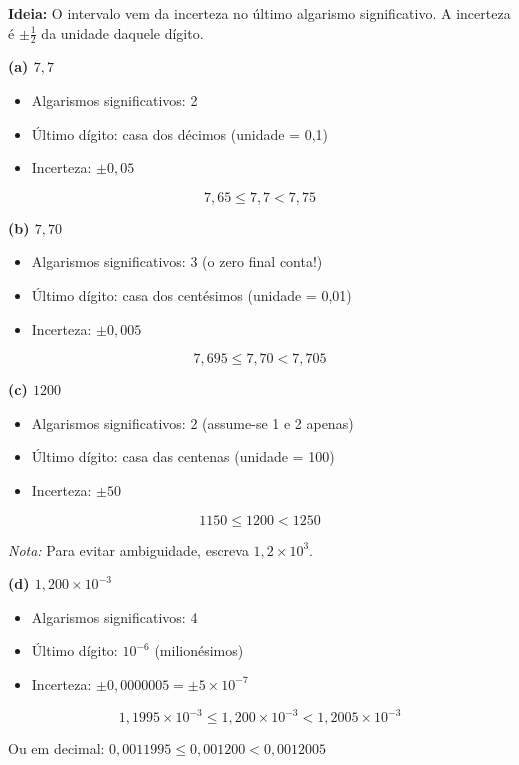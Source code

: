 
\textbf{Ideia:} O intervalo vem da incerteza no último algarismo significativo. A incerteza é $\pm\frac{1}{2}$ da unidade daquele dígito.

\textbf{(a) $7{,}7$}

\begin{itemize}
\item Algarismos significativos: 2
\item Último dígito: casa dos décimos (unidade = 0,1)
\item Incerteza: $\pm 0{,}05$
\end{itemize}

\[
\boxed{7{,}65 \leq 7{,}7 < 7{,}75}
\]

\textbf{(b) $7{,}70$}

\begin{itemize}
\item Algarismos significativos: 3 (o zero final conta!)
\item Último dígito: casa dos centésimos (unidade = 0,01)
\item Incerteza: $\pm 0{,}005$
\end{itemize}

\[
\boxed{7{,}695 \leq 7{,}70 < 7{,}705}
\]

\textbf{(c) $1200$}

\begin{itemize}
\item Algarismos significativos: 2 (assume-se 1 e 2 apenas)
\item Último dígito: casa das centenas (unidade = 100)
\item Incerteza: $\pm 50$
\end{itemize}

\[
\boxed{1150 \leq 1200 < 1250}
\]

\textit{Nota:} Para evitar ambiguidade, escreva $1{,}2 \times 10^3$.

\textbf{(d) $1{,}200 \times 10^{-3}$}

\begin{itemize}
\item Algarismos significativos: 4
\item Último dígito: $10^{-6}$ (milionésimos)
\item Incerteza: $\pm 0{,}0000005 = \pm 5 \times 10^{-7}$
\end{itemize}

\[
\boxed{1{,}1995 \times 10^{-3} \leq 1{,}200 \times 10^{-3} < 1{,}2005 \times 10^{-3}}
\]

Ou em decimal: $0{,}0011995 \leq 0{,}001200 < 0{,}0012005$